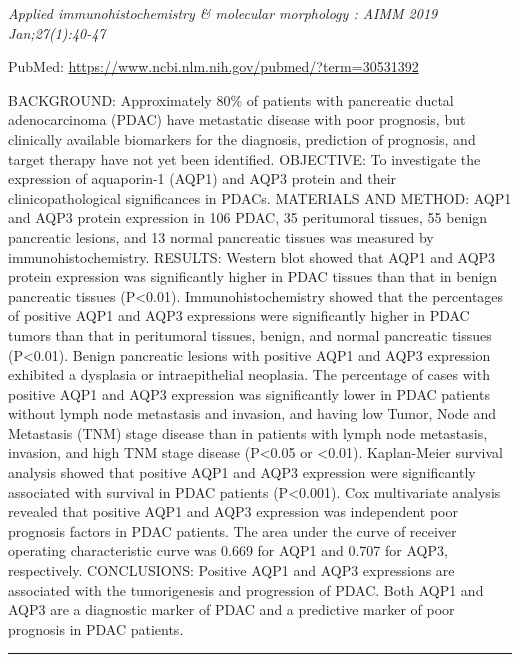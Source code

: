 \documentclass[]{article}
\begin{document}
\emph{Applied immunohistochemistry \& molecular morphology : AIMM 2019
Jan;27(1):40-47}

PubMed: \url{https://www.ncbi.nlm.nih.gov/pubmed/?term=30531392}

BACKGROUND: Approximately 80\% of patients with pancreatic ductal
adenocarcinoma (PDAC) have metastatic disease with poor prognosis, but
clinically available biomarkers for the diagnosis, prediction of
prognosis, and target therapy have not yet been identified. OBJECTIVE:
To investigate the expression of aquaporin-1 (AQP1) and AQP3 protein and
their clinicopathological significances in PDACs. MATERIALS AND METHOD:
AQP1 and AQP3 protein expression in 106 PDAC, 35 peritumoral tissues, 55
benign pancreatic lesions, and 13 normal pancreatic tissues was measured
by immunohistochemistry. RESULTS: Western blot showed that AQP1 and AQP3
protein expression was significantly higher in PDAC tissues than that in
benign pancreatic tissues (P\textless{}0.01). Immunohistochemistry
showed that the percentages of positive AQP1 and AQP3 expressions were
significantly higher in PDAC tumors than that in peritumoral tissues,
benign, and normal pancreatic tissues (P\textless{}0.01). Benign
pancreatic lesions with positive AQP1 and AQP3 expression exhibited a
dysplasia or intraepithelial neoplasia. The percentage of cases with
positive AQP1 and AQP3 expression was significantly lower in PDAC
patients without lymph node metastasis and invasion, and having low
Tumor, Node and Metastasis (TNM) stage disease than in patients with
lymph node metastasis, invasion, and high TNM stage disease
(P\textless{}0.05 or \textless{}0.01). Kaplan-Meier survival analysis
showed that positive AQP1 and AQP3 expression were significantly
associated with survival in PDAC patients (P\textless{}0.001). Cox
multivariate analysis revealed that positive AQP1 and AQP3 expression
was independent poor prognosis factors in PDAC patients. The area under
the curve of receiver operating characteristic curve was 0.669 for AQP1
and 0.707 for AQP3, respectively. CONCLUSIONS: Positive AQP1 and AQP3
expressions are associated with the tumorigenesis and progression of
PDAC. Both AQP1 and AQP3 are a diagnostic marker of PDAC and a
predictive marker of poor prognosis in PDAC patients.

{}

{}

\begin{center}\rule{0.5\linewidth}{\linethickness}\end{center}
\end{document}
